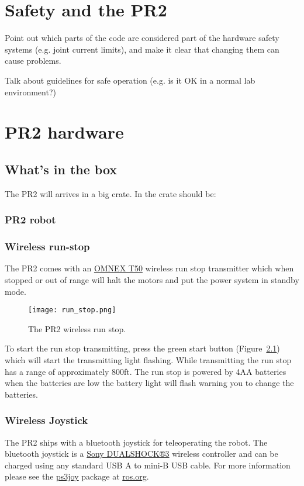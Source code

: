 \chapter{Safety and the PR2}
Point out which parts of the code are considered part of the hardware safety systems (e.g. joint current limits), and make it clear that changing them can cause problems.

Talk about guidelines for safe operation (e.g. is it OK in a normal lab environment?)

\chapter{PR2 hardware}

\section{What's in the box}
The PR2 will arrives in a big crate.  In the crate should be:
\subsection{PR2 robot}
\subsection{Wireless run-stop}
The PR2 comes with an \href{http://www.omnexcontrols.com/products/portable/t50.html}{OMNEX T50} 
wireless run stop transmitter which when stopped or out of range will halt the motors and put the power system in standby mode. 

\begin{figure}[h]
\centering
\texttt{[image: run\_stop.png]}
\caption{The PR2 wireless run stop.}
\label{fig:runstop}
\end{figure}

To start the run stop transmitting, press the green start button (Figure~\ref{fig:runstop}) which will start the transmitting 
light flashing. While transmitting the run stop has a range of approximately 800ft. The run stop is powered by 4AA batteries 
when the batteries are low the battery light will flash warning you to change the batteries.

\subsection{Wireless Joystick}
The PR2 ships with a bluetooth joystick for teleoperating the robot. The bluetooth joystick is a 
\href{http://www.sonystyle.com/webapp/wcs/stores/servlet/ProductDisplay?catalogId=10551&storeId=10151&langId=-1&productId=8198552921665411965#additionalImage1%22}{Sony DUALSHOCK®3} 
wireless controller and can be charged using any standard USB A to mini-B USB cable. For more information please see the 
\href{http://www.ros.org/wiki/ps3joy}{ps3joy} package at \href{http://www.ros.org}{ros.org}.

